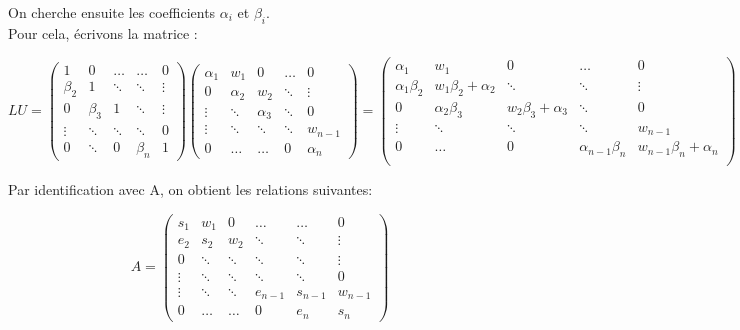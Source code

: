 \documentclass{article}
\begin{document}
\begingroup\raggedleft
On cherche ensuite les coefficients $\alpha_i$ et $\beta_i$.
\endgroup
\\
Pour cela, \'ecrivons la matrice :
\begin{addmargin}[-9em]{4em}
\[LU=\begin{pmatrix}
1 & 0 & \ldots & \ldots & 0 \\
\beta_2 & 1 & \ddots & \ddots & \vdots \\
0 & \beta_3 & 1 & \ddots & \vdots \\ 
\vdots & \ddots & \ddots & \ddots & 0\\
0 & \ddots & 0 & \beta_n & 1
\end{pmatrix}
\begin{pmatrix}
\alpha_1 & w_1 & 0 & \ldots & 0 \\
0 & \alpha_2 & w_2 & \ddots & \vdots \\
\vdots & \ddots & \alpha_3 & \ddots & 0 \\
\vdots & \ddots & \ddots & \ddots & w_{n-1} \\
0 & \ldots & \ldots & 0 & \alpha_n
\end{pmatrix}
=
\begin{pmatrix}
   \alpha_1 & w_1 & 0 & \ldots & 0 \\
   \alpha_1\beta_2 & w_1\beta_2+\alpha_2 & \ddots & \ddots & \vdots \\
   0 & \alpha_2\beta_3 & w_2\beta_3+\alpha_3 & \ddots & 0 \\
   \vdots & \ddots &\ddots & \ddots & w_{n-1} \\
    0& \ldots & 0 & \alpha_{n-1}\beta_n & w_{n-1}\beta_n+\alpha_n \\ 
\end{pmatrix}\]
\end{addmargin}

\begingroup\raggedleft
Par identification avec A, on obtient les relations suivantes:
\endgroup

\[A=\begin{pmatrix}
s_1 & w_1 & 0 & \ldots & \ldots & 0 \\
e_2 & s_2 & w_2 & \ddots & \ddots & \vdots \\
0 & \ddots & \ddots & \ddots & \ddots & \vdots \\
\vdots & \ddots & \ddots & \ddots & \ddots & 0 \\
\vdots & \ddots & \ddots & e_{n-1} & s_{n-1} & w_{n-1} \\
0 & \ldots & \ldots & 0 & e_n & s_n
\end{pmatrix}\]
\end{document}
